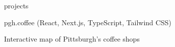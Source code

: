 \documentclass{resume} %
\begin{document}

 \begin{rSection}
 {projects
 }

   \begin{rSubsection}{pgh.coffee {\normalfont (React, Next.js, TypeScript, Tailwind CSS)}}{}{}{}
   \item Interactive map of Pittsburgh's coffee shops
   \item \href{https://pgh.coffee/}{} \textbar \ \href{https://github.com/Johngeorgesample/pgh-coffee}{}
   \end{rSubsection}






\end{rSection}
\end{document}
